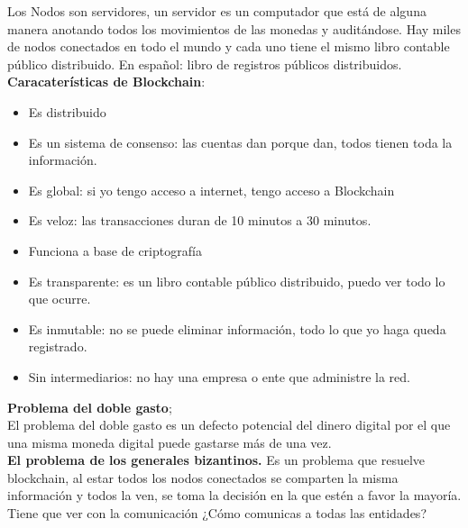 \documentclass[a4paper,12pt]{/home/armando/Documentos/Cursos/LaTeX/Plantillas/lib/pub}
\begin{document}
Los Nodos son servidores, un servidor es un computador que está de alguna manera anotando todos los movimientos de las monedas y auditándose. Hay miles de nodos conectados en todo el mundo y cada uno tiene el mismo libro contable público distribuido. En español: libro de registros públicos distribuidos.\\
\textbf{Caracaterísticas de Blockchain}:
\begin{itemize}	
	\item Es distribuido
	\item Es un sistema de consenso: las cuentas dan porque dan, todos tienen toda la información.
	\item Es global: si yo tengo acceso a internet, tengo acceso a Blockchain
	\item Es veloz: las transacciones duran de 10 minutos a 30 minutos.
	\item Funciona a base de criptografía
	\item Es transparente: es un libro contable público distribuido, puedo ver todo lo que ocurre.
	\item Es inmutable: no se puede eliminar información, todo lo que yo haga queda registrado.
	\item Sin intermediarios: no hay una empresa o ente que administre la red.
\end{itemize}
\textbf{Problema del doble gasto};\\
El problema del doble gasto es un defecto potencial del dinero digital por el que una misma moneda digital puede gastarse más de una vez.\\
\textbf{El problema de los generales bizantinos.}
Es un problema que resuelve blockchain, al estar todos los nodos conectados se comparten la misma información y todos la ven, se toma la decisión en la que estén a favor la mayoría. Tiene que ver con la comunicación ¿Cómo comunicas a todas las entidades?
\end{document}
